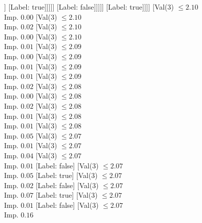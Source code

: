 \documentclass[margin=10pt]{standalone}
\begin{document}
\begin{forest}
																		[Label: false]
																		[Val($3$) $ \leq 2.06$ \\ Imp. $0.11$
																			[Val($3$) $ \leq 2.06$ \\ Imp. $0.50$
																				[Label: true]
																				[Label: false]]
																			[Label: true]]]]]
															[Label: false]]]]]
											[Label: true]]]]
								[Val($3$) $ \leq 2.10$ \\ Imp. $0.00$
									[Val($3$) $ \leq 2.10$ \\ Imp. $0.02$
										[Val($3$) $ \leq 2.10$ \\ Imp. $0.00$
											[Val($3$) $ \leq 2.10$ \\ Imp. $0.01$
												[Val($3$) $ \leq 2.09$ \\ Imp. $0.00$
													[Val($3$) $ \leq 2.09$ \\ Imp. $0.01$
														[Val($3$) $ \leq 2.09$ \\ Imp. $0.01$
															[Val($3$) $ \leq 2.09$ \\ Imp. $0.02$
																[Val($3$) $ \leq 2.08$ \\ Imp. $0.00$
																	[Val($3$) $ \leq 2.08$ \\ Imp. $0.02$
																		[Val($3$) $ \leq 2.08$ \\ Imp. $0.01$
																			[Val($3$) $ \leq 2.08$ \\ Imp. $0.01$
																				[Val($3$) $ \leq 2.08$ \\ Imp. $0.05$
																					[Val($3$) $ \leq 2.07$ \\ Imp. $0.01$
																						[Val($3$) $ \leq 2.07$ \\ Imp. $0.04$
																							[Val($3$) $ \leq 2.07$ \\ Imp. $0.01$
																								[Label: false]
																								[Val($3$) $ \leq 2.07$ \\ Imp. $0.05$
																									[Label: true]
																									[Val($3$) $ \leq 2.07$ \\ Imp. $0.02$
																										[Label: false]
																										[Val($3$) $ \leq 2.07$ \\ Imp. $0.07$
																											[Label: true]
																											[Val($3$) $ \leq 2.07$ \\ Imp. $0.01$
																												[Label: false]
																												[Val($3$) $ \leq 2.07$ \\ Imp. $0.16$

\end{forest}
\end{document}
